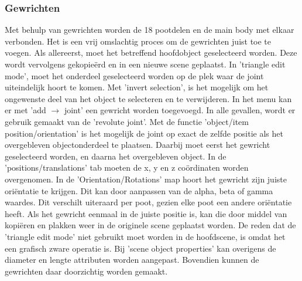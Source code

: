 \documentclass[10pt,a4paper]{article}
\begin{document}
\subsubsection{Gewrichten}
 Met behulp van gewrichten worden de 18 pootdelen en de main body met elkaar verbonden. Het is een vrij omslachtig proces om de gewrichten juist toe te voegen. Als allereerst, moet het betreffend hoofdobject geselecteerd worden. Deze wordt vervolgens gekopie\"erd en in een nieuwe scene geplaatst. In 'triangle edit mode', moet het onderdeel geselecteerd worden op de plek waar de joint uiteindelijk hoort te komen. Met 'invert selection', is het mogelijk om het ongewenste deel van het object te selecteren en te verwijderen. In het menu kan er met 'add $\rightarrow$ joint' een gewricht worden toegevoegd. In alle gevallen, wordt er gebruik gemaakt van de 'revolute joint'. Met de functie 'object/item position/orientation' is het mogelijk de joint op exact de zelfde positie als het overgebleven objectonderdeel te plaatsen. Daarbij moet eerst het gewricht geselecteerd worden, en daarna het overgebleven object. In de 'positions/translations' tab moeten de x, y en z co\"ordinaten worden overgenomen. In de 'Orientation/Rotations' map hoort het gewricht zijn juiste ori\"entatie te krijgen. Dit kan door aanpassen van de alpha, beta of gamma waardes. Dit verschilt uiteraard per poot, gezien elke poot een andere ori\"entatie heeft. Als het gewricht eenmaal in de juiste positie is, kan die door middel van kopi\"eren en plakken weer in de originele scene geplaatst worden. De reden dat de 'triangle edit mode' niet gebruikt moet worden in de hoofdscene, is omdat het een grafisch zware operatie is. Bij 'scene object properties' kan overigens de diameter en lengte attributen worden aangepast. Bovendien kunnen de gewrichten daar doorzichtig worden gemaakt.
\end{document}

